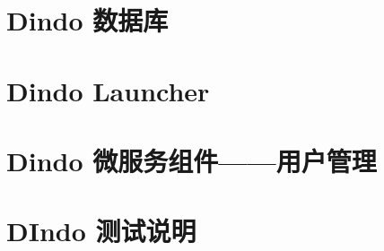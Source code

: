 \documentclass{dingo}
\begin{document}
  \section{Dindo 数据库}

  \section{Dindo Launcher}

  \section{Dindo 微服务组件——用户管理}

  \section{DIndo 测试说明}
\end{document}
